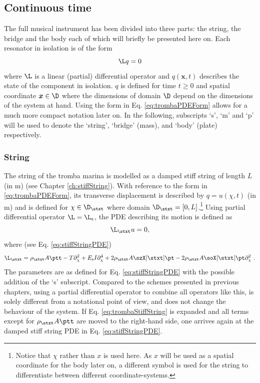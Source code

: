 \subsection{Continuous time}
The full musical instrument has been divided into three parts: the string, the bridge and the body each of which will briefly be presented here on. Each resonator in isolation is of the form 
\begin{equation}\label{eq:trombaPDEForm}
    \L q = 0
\end{equation}
where $\L$ is a linear (partial) differential operator and $q(\boldsymbol{x}, t)$ describes the state of the component in isolation. $q$ is defined for time $t\geq 0$ and spatial coordinate $\boldsymbol{x}\in \D$ where the dimensions of domain $\D$ depend on the dimensions of the system at hand. Using the form in Eq. \eqref{eq:trombaPDEForm} allows for a much more compact notation later on. In the following, subscripts `s', `m' and `p' will be used to denote the `string', `bridge' (mass), and `body' (plate) respectively.

\subsubsection{String}
The string of the tromba marina is modelled as a damped stiff string of length $L$ (in m) (see Chapter \ref{ch:stiffString}). With reference to the form in \eqref{eq:trombaPDEForm}, its transverse displacement is described by $q = u(\chi, t)$ (in m) and is defined for $\chi \in \D_\stxt$ where domain $\D_\stxt = [0, L]$.\footnote{Notice that $\chi$ rather than $x$ is used here. As $x$ will be used as a spatial coordinate for the body later on, a different symbol is used for the string to differentiate between different coordinate-systems.} Using partial differential operator $\L = \L_\text{s}$, the PDE describing its motion is defined as
\begin{equation}\label{eq:trombaStiffString}
    \L_\stxt u =  0,
\end{equation}
where (see Eq. \eqref{eq:stiffStringPDE})
\begin{equation*}
    \L_\stxt = \rho_\stxt A \ptt - T\partial_\chi^2 + E_\text{s}I\partial_\chi^4+2\rho_\stxt A\szX[\stxt]\pt-2\rho_\stxt A\soX[\stxt]\pt\partial_\chi^2\ .
\end{equation*}
The parameters are as defined for Eq. \eqref{eq:stiffStringPDE} with the possible addition of the `s' subscript.
Compared to the schemes presented in previous chapters, using a partial differential operator to combine all operators like this, is solely different from a notational point of view, and does not change the behaviour of the system. If Eq. \eqref{eq:trombaStiffString} is expanded and all terms except for $\rho_\stxt A \ptt$ are moved to the right-hand side, one arrives again at the damped stiff string PDE in Eq. \eqref{eq:stiffStringPDE}.

